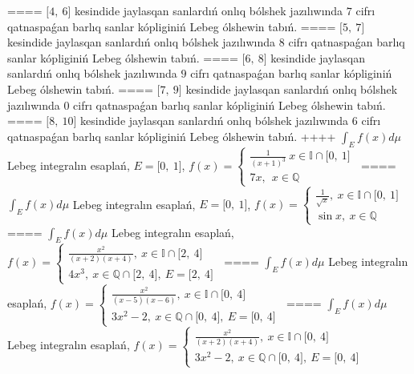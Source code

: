 ====
\(\lbrack 4,\ 6\rbrack\) kesindide jaylasqan sanlardıń onlıq bólshek jazılıwında \(7\) cifrı qatnaspaǵan barlıq sanlar kópliginiń Lebeg ólshewin tabıń.
====
\(\lbrack 5,\ 7\rbrack\) kesindide jaylasqan sanlardıń onlıq bólshek jazılıwında \(8\) cifrı qatnaspaǵan barlıq sanlar kópliginiń Lebeg ólshewin tabıń.
====
\(\lbrack 6,\ 8\rbrack\) kesindide jaylasqan sanlardıń onlıq bólshek jazılıwında \(9\) cifrı qatnaspaǵan barlıq sanlar kópliginiń Lebeg ólshewin tabıń.
====
\(\lbrack 7,\ 9\rbrack\) kesindide jaylasqan sanlardıń onlıq bólshek jazılıwında \(0\) cifrı qatnaspaǵan barlıq sanlar kópliginiń Lebeg ólshewin tabıń.
====
\(\lbrack 8,\ 10\rbrack\) kesindide jaylasqan sanlardıń onlıq bólshek jazılıwında \(6\) cifrı qatnaspaǵan barlıq sanlar kópliginiń Lebeg ólshewin tabıń.
++++
\(\int_{E}^{}f(x)d\mu\) Lebeg integralın esaplań, \(E = \lbrack 0,\ 1\rbrack\), \(f(x) = \left\{ \begin{matrix}
\frac{1}{(x + 1)^{3}}\ x \in \mathbb{I} \cap \lbrack 0,\ 1\rbrack \\
7x,\ \ x\mathbb{\in Q}
\end{matrix} \right.\ \)
====
\(\int_{E}^{}f(x)d\mu\) Lebeg integralın esaplań, \(E = \lbrack 0,\ 1\rbrack\), \(f(x) = \left\{ \begin{matrix}
\frac{1}{\sqrt{x}},\ x \in \mathbb{I} \cap \lbrack 0,\ 1\rbrack \\
\sin x,\ x\mathbb{\in Q}
\end{matrix} \right.\ \)
====
\(\int_{E}^{}f(x)d\mu\) Lebeg integralın esaplań, \(f(x) = \left\{ \begin{matrix}
\frac{x^{2}}{(x + 2)(x + 4)},\ x \in \mathbb{I} \cap \lbrack 2,\ 4\rbrack \\
4x^{3},\ x\mathbb{\in Q \cap}\lbrack 2,\ 4\rbrack,\ E = \lbrack 2,\ 4\rbrack
\end{matrix} \right.\ \)
====
\(\int_{E}^{}f(x)d\mu\) Lebeg integralın esaplań, \(f(x) = \left\{ \begin{matrix}
\frac{x^{2}}{(x - 5)(x - 6)},\ x \in \mathbb{I} \cap \lbrack 0,\ 4\rbrack \\
3x^{2} - 2,\ x\mathbb{\in Q \cap}\lbrack 0,\ 4\rbrack,\ E = \lbrack 0,\ 4\rbrack
\end{matrix} \right.\ \)
====
\(\int_{E}^{}f(x)d\mu\) Lebeg integralın esaplań, \(f(x) = \left\{ \begin{matrix}
\frac{x^{2}}{(x + 2)(x + 4)},\ x \in \mathbb{I} \cap \lbrack 0,\ 4\rbrack \\
3x^{2} - 2,\ x\mathbb{\in Q \cap}\lbrack 0,\ 4\rbrack,\ E = \lbrack 0,\ 4\rbrack
\end{matrix} \right.\ \)
